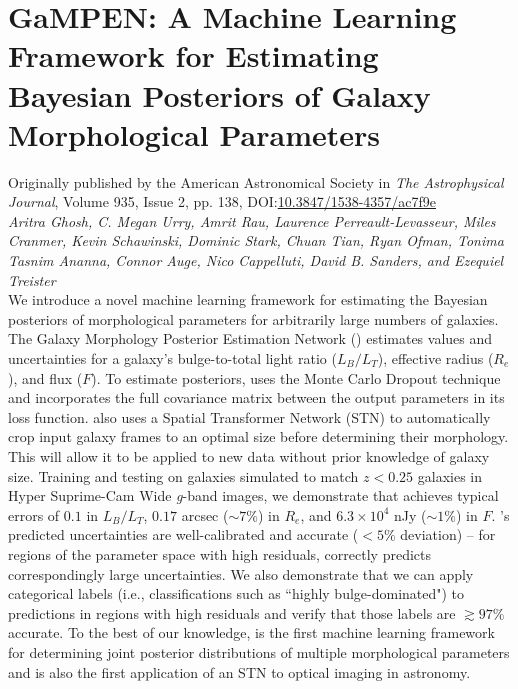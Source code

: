 \chapter{GaMPEN: A Machine Learning Framework for Estimating Bayesian Posteriors of Galaxy Morphological Parameters}

Originally published by the American Astronomical Society in \textit{The Astrophysical Journal}, Volume 935, Issue 2, pp. 138, DOI:\href{https://iopscience.iop.org/article/10.3847/1538-4357/ac7f9e}{10.3847/1538-4357/ac7f9e}\\
{\large \emph{Aritra Ghosh, C. Megan Urry, Amrit Rau, Laurence Perreault-Levasseur, Miles Cranmer, Kevin Schawinski, Dominic Stark, Chuan Tian, Ryan Ofman, Tonima Tasnim Ananna, Connor Auge, Nico Cappelluti, David B. Sanders, and Ezequiel Treister} }\\


We introduce a novel machine learning framework for estimating the Bayesian posteriors of morphological parameters for arbitrarily large numbers of galaxies.
The Galaxy Morphology Posterior Estimation Network (\gampen{}) 
estimates values and uncertainties for a galaxy's bulge-to-total light ratio ($L_B/L_T$), effective radius ($R_e$), and flux ($F$). To estimate posteriors, \gampen{} uses the Monte Carlo Dropout technique and incorporates the full covariance matrix between the output parameters in its loss function. %
\gampen{} also uses a Spatial Transformer Network (STN) to automatically crop input galaxy frames to an optimal size before determining their morphology. This will allow it to be applied to new data without prior knowledge of galaxy size.
Training and testing \gampen{} on galaxies simulated to match $z < 0.25$ galaxies in Hyper Suprime-Cam Wide \textit{g}-band images, we demonstrate that \gampen{} achieves typical errors of $0.1$ in $L_B/L_T$, $0.17$ arcsec ($\sim 7\%$) in $R_e$, and $6.3\times10^4$ nJy ($\sim 1\%$) in $F$. \gampen{}'s predicted uncertainties
are well-calibrated and accurate ($<5\%$ deviation) -- for regions of the parameter space with high residuals, \gampen{} correctly predicts correspondingly large uncertainties.
We also demonstrate that we can apply categorical labels (i.e., classifications such as ``highly bulge-dominated") to predictions in regions with high residuals and verify that those labels are  $\gtrsim 97\%$ accurate. To the best of our knowledge, \gampen{} is the first machine learning framework for determining joint posterior distributions of multiple morphological parameters and is also the first application of an STN to optical imaging in astronomy.


